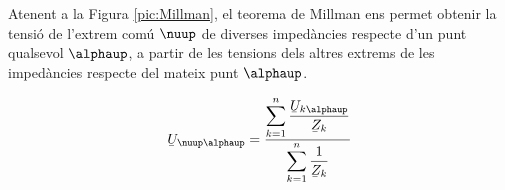 Atenent a la Figura \vref{pic:Millman}, el teorema
de Millman ens permet
obtenir la tensió de l'extrem comú $\nuup$ de diverses impedàncies respecte d'un punt
qualsevol $\alphaup$, a partir de les tensions dels altres extrems de les impedàncies respecte  del mateix punt $\alphaup$.

\hfill
\begin{minipage}[b]{7cm}
    
    \label{pic:Millman}
\end{minipage}
\hfill
\begin{minipage}[b][4.5cm][t]{6cm}
    \begin{equation}
        \cmplx{U}_{\nuup\alphaup} = \frac{\displaystyle\sum_{k=1}^n \dfrac{\cmplx{U}_{k\alphaup}}{\cmplx{Z}_k}} {\displaystyle\sum_{k=1}^n \dfrac{1}{\cmplx{Z}_k}}
        \label{eq:millman}
    \end{equation}
\end{minipage}


\pagebreak

